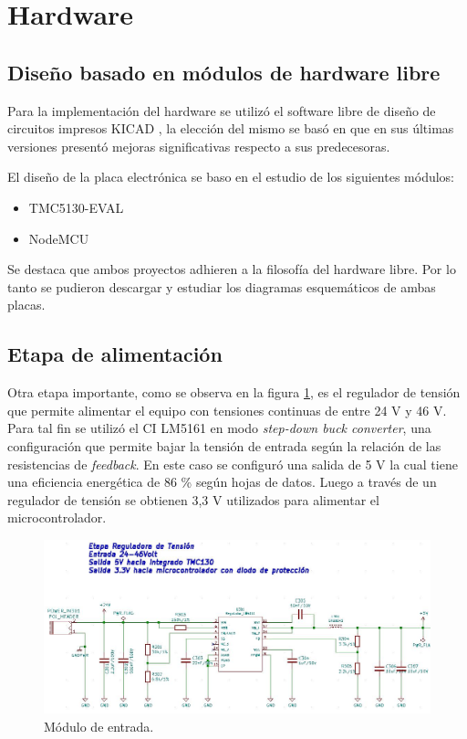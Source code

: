 \section{Hardware}
\subsection{Diseño basado en módulos de hardware libre}
\label{subsection:Diseño basado en módulos de hardware libre}

Para la implementación del hardware se utilizó el software libre de diseño de circuitos impresos KICAD \citep{web_kicad}, la elección del mismo se basó en que en sus últimas versiones presentó mejoras significativas respecto a sus predecesoras.

El diseño de la placa electrónica se baso en el estudio de los siguientes módulos:
\begin{itemize}
\item TMC5130-EVAL \citep{3_web_trinamic_placa}	
\item NodeMCU \citep{web_nodemcu}
\end{itemize}
Se destaca que ambos proyectos adhieren a la filosofía del hardware libre. Por lo tanto se pudieron descargar y estudiar los diagramas esquemáticos de ambas placas. 

\subsection{Etapa de alimentación}

Otra etapa importante, como se observa en la figura \ref{fig:kicad_tension}, es el regulador de tensión que permite alimentar el equipo con tensiones continuas de entre 24 V y 46 V. Para tal fin se utilizó el CI LM5161 en modo \textit{step-down buck converter}, una configuración que permite bajar la tensión de entrada según la relación de las resistencias de \textit{feedback}. En este caso se configuró una salida de 5 V la cual tiene una eficiencia energética de 86 \% según hojas de datos. Luego a través de un regulador de tensión se obtienen 3,3 V utilizados para alimentar el microcontrolador.

\begin{figure}[!h]
	\centering
	\includegraphics[width=1\textwidth]{./Figures/kicad_tension.jpg}
	\caption{Módulo de entrada.}
	\label{fig:kicad_tension}
\end{figure}
  

